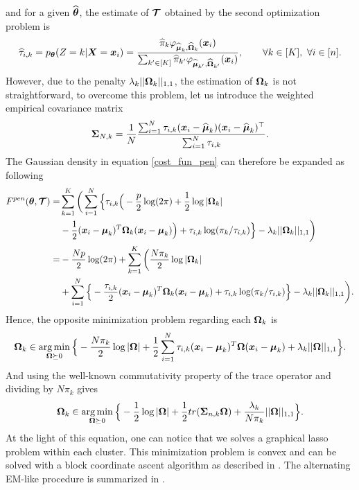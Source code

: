 and for a given $\widehat{{\boldsymbol\theta}}$, the estimate of $\boldsymbol{\mathcal T}$ obtained by the second optimization problem is
\begin{equation}
\label{em-sols-tau}
\widehat\tau_{i,k} = p_{{\boldsymbol\theta}}(Z=k|\boldsymbol X=\boldsymbol x_i)=\frac{\widehat\pi_k\varphi_{\widehat{\boldsymbol\mu}_k,\widehat{\boldsymbol\Omega}_k}(\boldsymbol x_i)}{\sum_{k'\in[K]}\widehat\pi_{k'}\varphi_{\widehat{\boldsymbol\mu}_{k'},\widehat{\boldsymbol\Omega}_{k'}}(\boldsymbol x_i)},\qquad\forall k\in[K],\ \forall i\in[n].
\end{equation}
However, due to the penalty $\lambda_k||\boldsymbol\Omega_k||_{1,1}$, the estimation of $\boldsymbol\Omega_k$ is not straightforward, to overcome this problem, let us introduce the weighted empirical covariance matrix
\begin{equation}
\boldsymbol\Sigma_{N,k} = \frac{1}{N}\frac{\sum_{i=1}^N\tau_{i,k}(\boldsymbol x_i-\widehat{\boldsymbol\mu}_k)(\boldsymbol x_i-\widehat{\boldsymbol\mu}_k)^\top}{\sum_{i=1}^N\tau_{i,k}}.
\end{equation}
The Gaussian density in equation \eqref{cost_fun_pen} can therefore be expanded as following
\begin{align*}
\label{cost_fun_pen_2}
F^{pen}({\boldsymbol\theta},\boldsymbol{\mathcal T})  =& \sum_{k=1}^K \bigg( \sum_{i=1}^{N}\Big\{ \tau_{i,k} \Big(
-\frac{p}{2}\log(2\pi)+\frac{1}{2}\log|\boldsymbol\Omega_k|\\
&-\frac{1}{2}(\boldsymbol x_i-\boldsymbol\mu_k)^T\boldsymbol\Omega_k(\boldsymbol x_i-\boldsymbol\mu_k) \Big)+\tau_{i,k} \log(\pi_k/\tau_{i,k})\Big\} -\lambda_k||\boldsymbol\Omega_k||_{1,1}\bigg)\\
=& -\frac{Np}{2}\log(2\pi)+\sum_{k=1}^K \bigg(\frac{N\pi_k}{2}\log|\boldsymbol\Omega_k|\\
&+\sum_{i=1}^{N}\Big\{ -\frac{\tau_{i,k}}{2}(\boldsymbol x_i-\boldsymbol\mu_k)^T\boldsymbol\Omega_k(\boldsymbol x_i-\boldsymbol\mu_k)+\tau_{i,k} \log(\pi_k/\tau_{i,k})\Big\} -\lambda_k||\boldsymbol\Omega_k||_{1,1}\bigg). 
\end{align*}
Hence, the opposite minimization problem regarding each $\boldsymbol\Omega_k$ is
\begin{equation}
\boldsymbol\Omega_k \in \operatorname*{arg\,min}_{ \boldsymbol\Omega\succeq 0}\Big\{-\frac{N\pi_k}{2}\log|\boldsymbol\Omega|+\frac{1}{2}\sum_{i=1}^{N}\tau_{i,k}(\boldsymbol x_i-\boldsymbol\mu_k)^T\boldsymbol\Omega(\boldsymbol x_i-\boldsymbol\mu_k)+\lambda_k||\boldsymbol\Omega||_{1,1}\Big\}.
\end{equation}
And using the well-known commutativity property of the trace operator and dividing by $N\pi_k$ gives
\begin{equation}
\boldsymbol\Omega_k \in \operatorname*{arg\,min}_{ \boldsymbol\Omega\succeq 0} \Big\{ -\frac{1}{2}\log|\boldsymbol\Omega| +\frac{1}{2} tr(\boldsymbol\Sigma_{n,k}\boldsymbol\Omega)+\frac{\lambda_k}{N\pi_k}||\boldsymbol\Omega||_{1,1}\Big\}.
\end{equation}
At the light of this equation, one can notice that we solves a graphical lasso problem within each cluster. This minimization problem is convex and can be solved with a block coordinate ascent algorithm as described in \citep{mazum_lasso}. The alternating EM-like procedure is summarized in .
